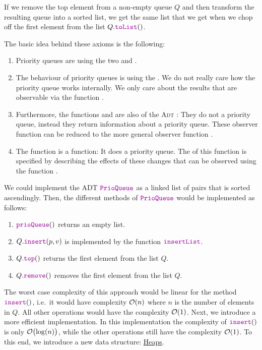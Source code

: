 \begin{Definition}
\begin{enumerate}
\begin{enumerate}
            If we remove the top element from a non-empty queue $Q$ and then transform the resulting queue into
            a sorted list, we get the same list that we get when we chop off the first element from the list
            $Q.\mytt{toList}()$.
      \end{enumerate}
      The basic idea behind these axioms is the following:  
      \begin{enumerate}
      \item Priority queues are  using the two   and
            .
      \item The behaviour of priority queues is  using the 
            .  We do not really care how the priority queue works internally.  We only care
            about the results that are observable via the function .  
      \item Furthermore, the functions  and  are also  of the
            \textsc{Adt} :  They do not  a priority queue, instead they return
            information about a priority queue.  These observer function can be reduced to the more general
            observer function . 
      \item The function  is a  function: It does
             a priority queue. 
            The  of this function is specified by describing the effects of these
            changes that can be observed using the function . 
      \end{enumerate}
\end{enumerate}
\end{Definition}
We could implement the ADT $\mytt{PrioQueue}$ as a linked list of pairs that is sorted ascendingly.
Then, the different methods of $\mytt{PrioQueue}$ would be implemented as follows:
\begin{enumerate}
\item $\mytt{prioQueue}()$ returns an empty list.
\item $Q.\mytt{insert}(p,v)$ is implemented by the function $\mytt{insertList}$. 
\item $Q.\mytt{top}()$ returns the first element from the list $Q$.
\item $Q.\mytt{remove}()$ removes the first element from the list $Q$.
\end{enumerate}
The worst case complexity of this approach would be linear for the method $\mytt{insert}()$,
i.e.~it would have complexity $\mathcal{O}(n)$ where $n$ is the number of elements in $Q$. 
All other operations would have the complexity $\mathcal{O}(1)$.  
Next, we introduce a more efficient implementation.  In this implementation the complexity of $\mytt{insert}()$ 
is only $\mathcal{O}\bigl(\log(n)\bigr)$, while the other operations still have the complexity $\mathcal{O}(1)$.
To this end, we introduce a new data structure: \href{https://en.wikipedia.org/wiki/Heap_(data_structure)}{Heaps}. 

